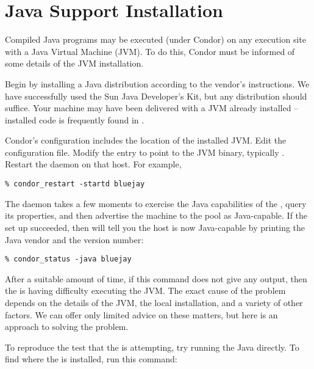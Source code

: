 \section{\label{sec:java-install}Java Support Installation}


Compiled Java programs may be executed (under Condor) on
any
execution site with a
Java Virtual Machine (JVM).
To do this,
Condor must be informed of some details of the
JVM installation.

Begin by installing a Java distribution according to the vendor's
instructions.
We have successfully used the Sun Java Developer's Kit,
but any distribution should suffice.
Your machine may have
been delivered with a JVM already installed -- installed code
is frequently found in .

Condor's configuration includes the location of the installed
JVM.
Edit the configuration file.
Modify the  entry to point to the JVM binary,
typically .
Restart the  daemon on that host.  For example,

\begin{verbatim}
% condor_restart -startd bluejay
\end{verbatim}

The  daemon takes a few moments to exercise the Java
capabilities of the , query its properties,
and then advertise the machine
to the pool as Java-capable.
If the set up succeeded, then  will
tell you the host is now Java-capable by printing the Java
vendor and the version number:

\begin{verbatim}
% condor_status -java bluejay
\end{verbatim}

After a suitable amount of time, if this command does not give any output,
then the   is having difficulty executing the JVM.
The exact cause of the problem depends on the details of the
JVM, the local installation, and a variety of other factors.
We can offer only limited advice on these matters,
but here is an approach to solving the problem.

To reproduce the test that the  is attempting,
try running the Java  directly.  To find
where the  is installed, run this command:

